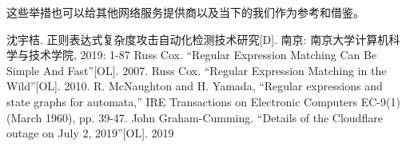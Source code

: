 \documentclass[hyperref,UTF8,12pt,a4paper]{ctexart}
\begin{document}
这些举措也可以给其他网络服务提供商以及当下的我们作为参考和借鉴。

\newpage



\begin{thebibliography}{99}
 沈宇桔. 正则表达式复杂度攻击自动化检测技术研究[D]. 南京: 南京大学计算机科学与技术学院, 2019: 1-87
 Russ Cox. “Regular Expression Matching Can Be Simple And Fast”[OL]. 2007.
 Russ Cox. “Regular Expression Matching in the Wild”[OL]. 2010.
 R. McNaughton and H. Yamada, “Regular expressions and state graphs for automata,” IRE Transactions on Electronic Computers EC-9(1) (March 1960), pp. 39-47.
 John Graham-Cumming. “Details of the Cloudflare outage on July 2, 2019”[OL]. 2019

\end {thebibliography}
\end{document}
